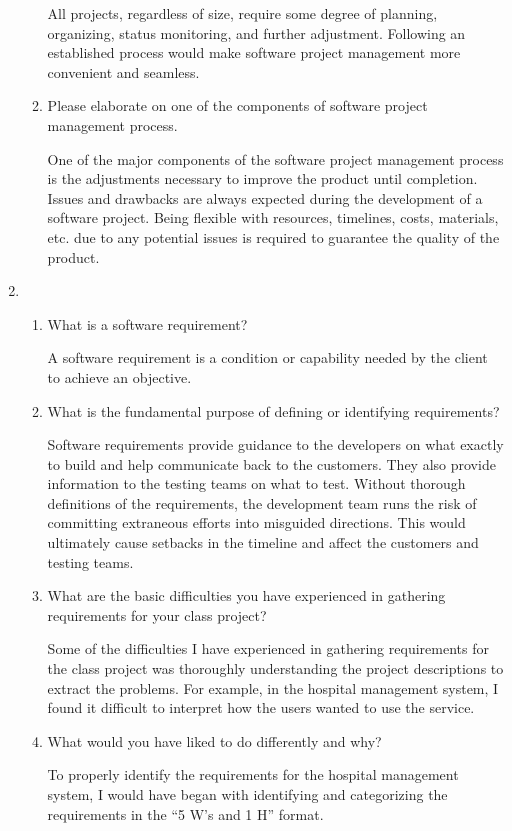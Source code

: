 \documentclass[12pt]{article}
\begin{document}
\begin{enumerate}
\begin{enumerate}[start=1,align=left]
      All projects, regardless of size, require some degree of planning, organizing, status monitoring, and further adjustment. Following an established process would make software project management more convenient and seamless.

      \item Please elaborate on one of the components of software project management process.

      One of the major components of the software project management process is the adjustments necessary to improve the product until completion. Issues and drawbacks are always expected during the development of a software project. Being flexible with resources, timelines, costs, materials, etc. due to any potential issues is required to guarantee the quality of the product.

    \end{enumerate}

    \item
    \begin{enumerate}[start=1,align=left]
      \item What is a software requirement?

      A software requirement is a condition or capability needed by the client to achieve an objective.

      \item What is the fundamental purpose of defining or identifying requirements?

      Software requirements provide guidance to the developers on what exactly to build and help communicate back to the customers. They also provide information to the testing teams on what to test. Without thorough definitions of the requirements, the development team runs the risk of committing extraneous efforts into misguided directions. This would ultimately cause setbacks in the timeline and affect the customers and testing teams.

      \item What are the basic difficulties you have experienced in gathering requirements for your class project?

      Some of the difficulties I have experienced in gathering requirements for the class project was thoroughly understanding the project descriptions to extract the problems. For example, in the hospital management system, I found it difficult to interpret how the users wanted to use the service.

      \item What would you have liked to do differently and why?

      To properly identify the requirements for the hospital management system, I would have began with identifying and categorizing the requirements in the ``5 W's and 1 H'' format.

    \end{enumerate}

  \end{enumerate}
\end{document}
